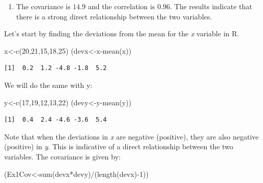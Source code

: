 \documentclass[
  letterpaper,
  DIV=11,
  numbers=noendperiod]{scrreprt}
\newenvironment{Shaded}{\begin{snugshade}}{\end{snugshade}}
\newcommand{\DecValTok}[1]{\textcolor[rgb]{0.68,0.00,0.00}{#1}}
\newcommand{\FunctionTok}[1]{\textcolor[rgb]{0.28,0.35,0.67}{#1}}
\newcommand{\NormalTok}[1]{\textcolor[rgb]{0.00,0.23,0.31}{#1}}
\newcommand{\OtherTok}[1]{\textcolor[rgb]{0.00,0.23,0.31}{#1}}
\newcommand{\SpecialCharTok}[1]{\textcolor[rgb]{0.37,0.37,0.37}{#1}}
\providecommand{\tightlist}{%
  \setlength{\itemsep}{0pt}\setlength{\parskip}{0pt}}\usepackage{longtable,booktabs,array}
\begin{document}
\begin{enumerate}
\def\labelenumi{\arabic{enumi}.}
\tightlist
\item
  The covariance is \(14.9\) and the correlation is \(0.96\). The
  results indicate that there is a strong direct relationship between
  the two variables.
\end{enumerate}

Let's start by finding the deviations from the mean for the \emph{x}
variable in R.

\begin{Shaded}
\begin{Highlighting}[numbers=left,,]
\NormalTok{x}\OtherTok{\textless{}{-}}\FunctionTok{c}\NormalTok{(}\DecValTok{20}\NormalTok{,}\DecValTok{21}\NormalTok{,}\DecValTok{15}\NormalTok{,}\DecValTok{18}\NormalTok{,}\DecValTok{25}\NormalTok{)}
\NormalTok{(devx}\OtherTok{\textless{}{-}}\NormalTok{x}\SpecialCharTok{{-}}\FunctionTok{mean}\NormalTok{(x))}
\end{Highlighting}
\end{Shaded}

\begin{verbatim}
[1]  0.2  1.2 -4.8 -1.8  5.2
\end{verbatim}

We will do the same with y:

\begin{Shaded}
\begin{Highlighting}[numbers=left,,]
\NormalTok{y}\OtherTok{\textless{}{-}}\FunctionTok{c}\NormalTok{(}\DecValTok{17}\NormalTok{,}\DecValTok{19}\NormalTok{,}\DecValTok{12}\NormalTok{,}\DecValTok{13}\NormalTok{,}\DecValTok{22}\NormalTok{)}
\NormalTok{(devy}\OtherTok{\textless{}{-}}\NormalTok{y}\SpecialCharTok{{-}}\FunctionTok{mean}\NormalTok{(y))}
\end{Highlighting}
\end{Shaded}

\begin{verbatim}
[1]  0.4  2.4 -4.6 -3.6  5.4
\end{verbatim}

Note that when the deviations in \emph{x} are negative (positive), they
are also negative (positive) in \emph{y}. This is indicative of a direct
relationship between the two variables. The covariance is given by:

\begin{Shaded}
\begin{Highlighting}[numbers=left,,]
\NormalTok{(Ex1Cov}\OtherTok{\textless{}{-}}\FunctionTok{sum}\NormalTok{(devx}\SpecialCharTok{*}\NormalTok{devy)}\SpecialCharTok{/}\NormalTok{(}\FunctionTok{length}\NormalTok{(devx)}\SpecialCharTok{{-}}\DecValTok{1}\NormalTok{))}
\end{Highlighting}
\end{Shaded}
\end{document}
